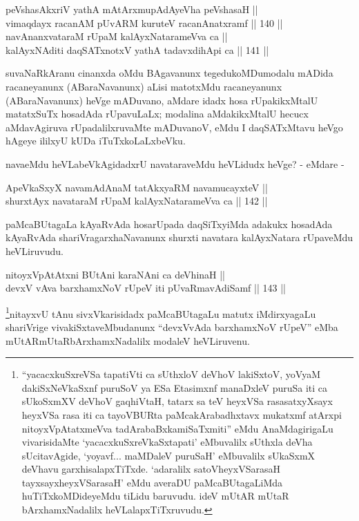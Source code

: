 
\begin{shl}
peVshasAkxriV yathA mAtArxmupAdAyeVha peVshasaH || \\
vimaqdayx racanAM pUvARM kuruteV racanAnatxramf \hfill || 140 ||  \\
navAnanxvataraM rUpaM kalAyxNatarameVva ca || \\
kalAyxNAditi daqSATxnotxV yathA tadavxdihApi ca \hfill || 141 ||  
\end{shl}

\begin{artha}
suvaNaRkAranu cinanxda oMdu BAgavanunx tegedukoMDu\break modalu mADida
racaneyanunx (ABaraNavanunx) aLisi matotxMdu racaneyanunx
(ABaraNavanunx) heVge mADuvano, aMdare idadx hosa rUpakikxMtalU
matatxSuTx hosadAda rUpavuLaLx; modalina aMdakikxMtalU hecucx
aMdavAgiruva rUpadalilxruvaMte mADuvanoV, eMdu I daqSATxMtavu heVgo
hAgeye ililxyU kUDa iTuTxkoLaLxbeVku.
\end{artha}

\begin{artha}
navaeMdu heVLabeVkAgidadxrU navataraveMdu heVLidudx heVge? - eMdare -
\end{artha}

\begin{shl}
ApeVkaSxyX navamAdAnaM tatAkxyaRM navamucayxteV || \\
shurxtAyx navataraM rUpaM kalAyxNatarameVva ca \hfill || 142 ||  
\end{shl}

\begin{artha}
paMcaBUtagaLa kAyaRvAda hosarUpada daqSiTxyiMda adakukx hosadAda
kAyaRvAda shariVragarxhaNavanunx shurxti navatara kalAyxNatara
rUpaveMdu heVLiruvudu.
\end{artha}


\begin{shl}
nitoyxVpAtAtxni BUtAni karaNAni ca deVhinaH || \\
devxV vAva barxhamxNoV rUpeV iti pUvaRmavAdiSamf \hfill || 143 ||  
\end{shl}

\begin{artha}
\footnote{``yacacxkuSxreVSa tapatiVti ca sUthxloV deVhoV lakiSxtoV, yoV\s yaM dakiSxNeV\s kaSxnf puruSoV ya ESa Etasimxnf manaDxleV puruSa iti ca sUkoSxmXV deVhoV gaqhiVtaH, tatarx sa teV heyxVSa rasa\break	 satxyXsayx heyxVSa rasa iti ca tayoVBURta paMcakArabadhxtavx mukatxmf atArxpi nitoyxVpAtatxmeVva tadArabaBxkamiSaTxmiti'' eMdu AnaMdagirigaLu vivarisidaMte `yacacxkuSxreVkaSxtapati' eMbuvalilx sUthxla deVha sUcitavAgide, `yo\s yavf... maMDaleV puruSaH' eMbuvalilx sUkaSxmX deVhavu garxhisalapxTiTxde. `adaralilx satoVheyxVSarasaH tayxsayxheyxVSarasaH' eMdu averaDU paMcaBUtagaLiMda huTiTxkoMDideyeMdu tiLidu baruvudu. ideV mUtAR mUtaR bArxhamxNadalilx heVLalapxTiTxruvudu.}nitayxvU tAnu sivxVkarisidadx paMcaBUtagaLu matutx iMdirxyagaLu shariVrige vivakiSxtaveMbudanunx ``devxVvAda barxhamxNoV rUpeV'' eMba mUtARmUtaRbArxhamxNadalilx modaleV heVLiruvenu.
\end{artha}

